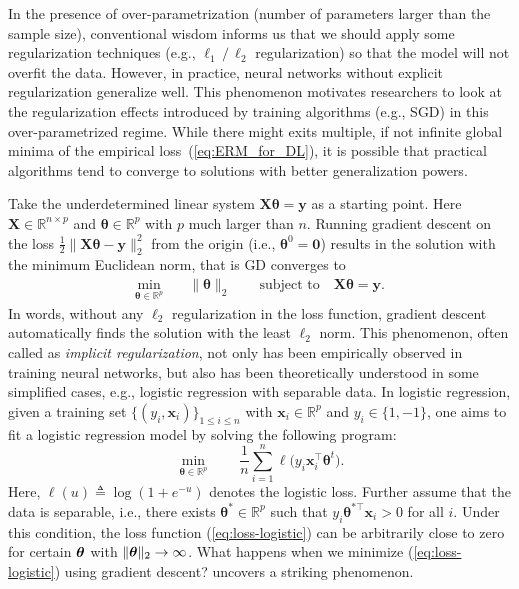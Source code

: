 In the presence of over-parametrization (number of parameters larger than the sample size), conventional wisdom informs us that we should apply some regularization techniques (e.g., $\ell_1\,/\, \ell_2$ regularization) so that the model will not overfit the data. However, in practice, neural networks without explicit regularization generalize well. This phenomenon motivates researchers to look at the regularization effects introduced by training algorithms (e.g., SGD) in this over-parametrized regime. While there might exits multiple, if not infinite global minima of the empirical loss~(\ref{eq:ERM_for_DL}), it is possible that practical algorithms tend to converge to solutions with better generalization powers.

Take the underdetermined linear system $\bm{X}\bm{\theta}=\bm{y}$
as a starting point. Here $\bm{X}\in\mathbb{R}^{n\times p}$ and $\bm{\theta}\in\mathbb{R}^{p}$
with $p$ much larger than $n$. Running gradient descent on the loss
$\frac{1}{2}\|\bm{X}\bm{\theta}-\bm{y}\|_{2}^{2}$ from the origin
(i.e., $\bm{\theta}^{0}=\bm{0}$) results in the solution with the minimum Euclidean
norm, that is GD converges to
\begin{align*}
\min_{\bm{\theta}\in\mathbb{R}^{p}} & \quad\|\bm{\theta}\|_{2}\qquad\text{subject to}\quad\bm{X}\bm{\theta}=\bm{y}.
\end{align*}
In words, without any $\ell_{2}$ regularization in the loss function,
gradient descent automatically finds the solution with the least $\ell_{2}$ norm.
This phenomenon, often called as \emph{implicit regularization}, not
only has been empirically observed in training neural networks, but
also has been theoretically understood in some simplified cases, e.g., logistic regression with separable data.
In logistic regression, given a training
set $\{(y_{i},\bm{x}_{i})\}_{1\leq i \leq n}$ with $\bm{x}_{i}\in\mathbb{R}^{p}$
and $y_{i}\in\{1,-1\}$, one aims to fit a logistic regression model
by solving the following program:
\begin{equation}
\min_{\bm{\theta}\in\mathbb{R}^{p}}\qquad\frac{1}{n}\sum_{i=1}^{n}\ell\big(y_{i}\bm{x}_{i}^\top \bm{\theta}^{t}\big).\label{eq:loss-logistic}
\end{equation}
Here, $\ell(u)\triangleq\log(1+e^{-u})$ denotes the logistic loss. Further
assume that the data is separable, i.e., there exists $\bm{\theta}^{*}\in\mathbb{R}^{p}$
such that $y_{i}\bm{\theta}^{*\top}\bm{x}_{i}>0$ for all $i$. Under this condition,
the loss function (\ref{eq:loss-logistic}) can be arbitrarily close to zero for certain $\text{\boldmath $\theta$}$ with $\| \text{\boldmath $\theta$} \|_2 \to \infty$.
What happens when we minimize (\ref{eq:loss-logistic}) using gradient
descent? \cite{soudry2018implicit} uncovers a striking phenomenon.


